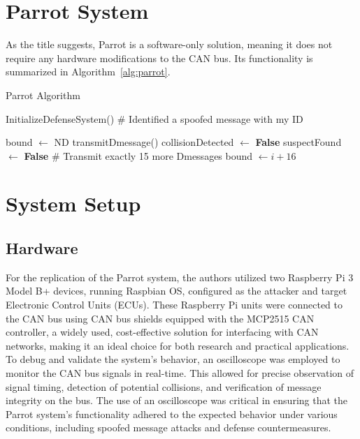 \documentclass[10pt,twocolumn,letterpaper]{article}
\begin{document}
\section{Parrot System}
As the title suggests, Parrot is a software-only solution, meaning it does not require any hardware modifications to the CAN bus. 
Its functionality is summarized in Algorithm~\ref{alg:parrot}.
\begin{algorithm}
    \caption{Parrot Algorithm}
    \label{alg:parrot}
    \begin{algorithmic}[1]
        \State InitializeDefenseSystem()
        \State \# Identified a spoofed message with my ID
        \State {}
        \EndIf
        \EndWhile
        \EndProcedure

        \State {}
        \EndWhile
        \EndProcedure

        \State bound $\gets$ ND
        \State transmitDmessage()
        \State collisionDetected $\gets$ \textbf{False}
        \State suspectFound $\gets$ \textbf{False}
        \State \# Transmit exactly 15 more Dmessages
        \State bound $\gets i + 16$
        \EndIf
        \EndFor
        \EndProcedure
    \end{algorithmic}
\end{algorithm}

\section{System Setup}
\subsection{Hardware}
For the replication of the Parrot system, the authors utilized two Raspberry Pi 3 Model B+ devices, running Raspbian OS, configured as the attacker and target Electronic Control Units (ECUs). 
These Raspberry Pi units were connected to the CAN bus using CAN bus shields equipped with the MCP2515 CAN controller, a widely used, cost-effective solution for interfacing with CAN networks, making it an ideal choice for both research and practical applications.
To debug and validate the system's behavior, an oscilloscope was employed to monitor the CAN bus signals in real-time. 
This allowed for precise observation of signal timing, detection of potential collisions, and verification of message integrity on the bus. 
The use of an oscilloscope was critical in ensuring that the Parrot system's functionality adhered to the expected behavior under various conditions, including spoofed message attacks and defense countermeasures.
\end{document}
